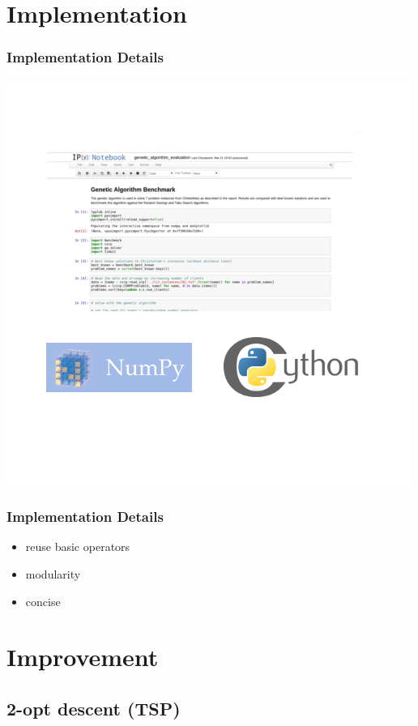 \documentclass{beamer}
\begin{document}
\section{Implementation}

\begin{frame}
\frametitle{Implementation Details}
\begin{center}
\includegraphics[scale=0.4]{figs/tools}

\end{center}
\end{frame}


\begin{frame}
\frametitle{Implementation Details}
\begin{itemize}
	\item reuse basic operators
	\item modularity
	\item concise
\end{itemize}
\end{frame}

\section{Improvement}
\subsection{2-opt descent (TSP)}
\end{document}
